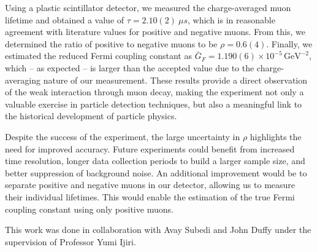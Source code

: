 \documentclass{../paper}
\begin{document}
Using a plastic scintillator detector, we measured the charge-averaged muon lifetime and obtained a value of $\tau = 2.10(2) \ \mu s$, which is in reasonable agreement with literature values for positive and negative muons. From this, we determined the ratio of positive to negative muons to be $\rho = 0.6(4)$. Finally, we estimated the reduced Fermi coupling constant as $\bar G_F = 1.190(6) \times 10^{-5} \, \text{GeV}^{-2}$, which -- as expected -- is larger than the accepted value due to the charge-averaging nature of our measurement. These results provide a direct observation of the weak interaction through muon decay, making the experiment not only a valuable exercise in particle detection techniques, but also a meaningful link to the historical development of particle physics.

Despite the success of the experiment, the large uncertainty in $\rho$ highlights the need for improved accuracy. Future experiments could benefit from increased time resolution, longer data collection periods to build a larger sample size, and better suppression of background noise. An additional improvement would be to separate positive and negative muons in our detector, allowing us to measure their individual lifetimes. This would enable the estimation of the true Fermi coupling constant using only positive muons.

\begin{acknowledgements}
  This work was done in collaboration with Avay Subedi and John Duffy under the supervision of Professor Yumi Ijiri.
\end{acknowledgements}


\end{document}
